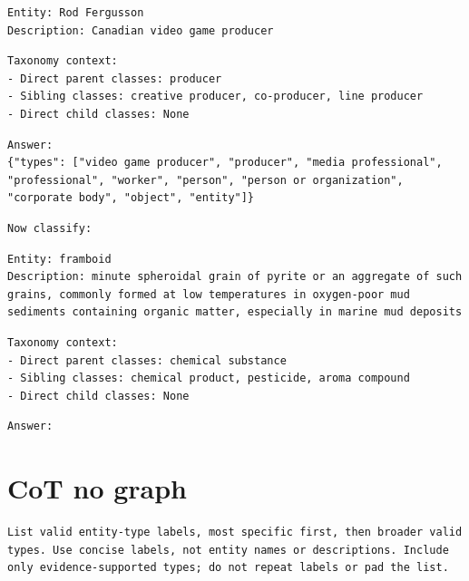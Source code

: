\begin{Verbatim}[fontsize=\footnotesize,breaklines=true,breakanywhere=true]
Entity: Rod Fergusson
Description: Canadian video game producer
\end{Verbatim}

\begin{Verbatim}[fontsize=\footnotesize,breaklines=true,breakanywhere=true]
Taxonomy context:
- Direct parent classes: producer
- Sibling classes: creative producer, co-producer, line producer
- Direct child classes: None
\end{Verbatim}

\begin{Verbatim}[fontsize=\footnotesize,breaklines=true,breakanywhere=true]
Answer:
{"types": ["video game producer", "producer", "media professional", "professional", "worker", "person", "person or organization", "corporate body", "object", "entity"]}
\end{Verbatim}

\begin{Verbatim}[fontsize=\footnotesize,breaklines=true,breakanywhere=true]
Now classify:
\end{Verbatim}

\begin{Verbatim}[fontsize=\footnotesize,breaklines=true,breakanywhere=true]
Entity: framboid
Description: minute spheroidal grain of pyrite or an aggregate of such grains, commonly formed at low temperatures in oxygen-poor mud sediments containing organic matter, especially in marine mud deposits
\end{Verbatim}

\begin{Verbatim}[fontsize=\footnotesize,breaklines=true,breakanywhere=true]
Taxonomy context:
- Direct parent classes: chemical substance
- Sibling classes: chemical product, pesticide, aroma compound
- Direct child classes: None
\end{Verbatim}

\begin{Verbatim}[fontsize=\footnotesize,breaklines=true,breakanywhere=true]
Answer:
\end{Verbatim}

\clearpage

\section{CoT no graph}

\begin{Verbatim}[fontsize=\footnotesize,breaklines=true,breakanywhere=true]
List valid entity-type labels, most specific first, then broader valid types. Use concise labels, not entity names or descriptions. Include only evidence-supported types; do not repeat labels or pad the list.
\end{Verbatim}

